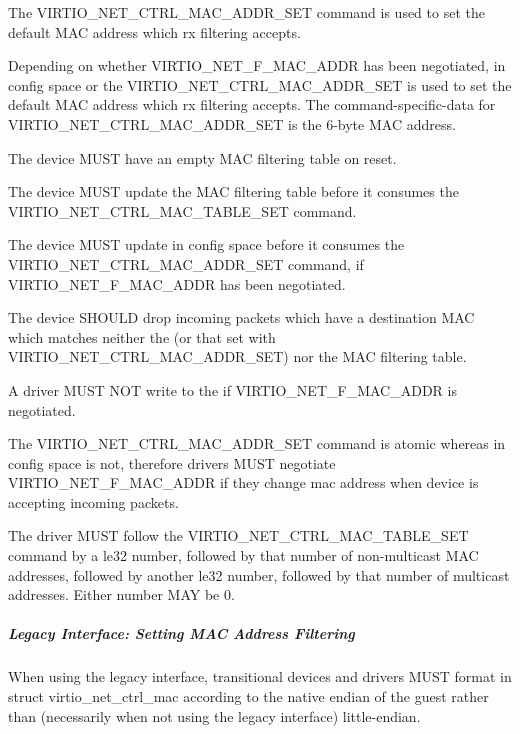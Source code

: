 The VIRTIO_NET_CTRL_MAC_ADDR_SET command is used to set the
default MAC address which rx filtering
accepts.

Depending on whether VIRTIO_NET_F_MAC_ADDR has been negotiated,
 in config space or the VIRTIO_NET_CTRL_MAC_ADDR_SET
is used to set the default MAC address which rx filtering
accepts.
The command-specific-data for VIRTIO_NET_CTRL_MAC_ADDR_SET is
the 6-byte MAC address.


The device MUST have an empty MAC filtering table on reset.

The device MUST update the MAC filtering table before it consumes
the VIRTIO_NET_CTRL_MAC_TABLE_SET command.

The device MUST update  in config space before it consumes
the VIRTIO_NET_CTRL_MAC_ADDR_SET command, if VIRTIO_NET_F_MAC_ADDR has
been negotiated.

The device SHOULD drop incoming packets which have a destination MAC which
matches neither the  (or that set with VIRTIO_NET_CTRL_MAC_ADDR_SET)
nor the MAC filtering table.


A driver MUST NOT write to the  if VIRTIO_NET_F_MAC_ADDR is
negotiated.

The
VIRTIO_NET_CTRL_MAC_ADDR_SET command is atomic whereas
 in config space is not, therefore drivers
MUST negotiate VIRTIO_NET_F_MAC_ADDR if they change
mac address when device is accepting incoming packets.

The driver MUST follow the VIRTIO_NET_CTRL_MAC_TABLE_SET command
by a le32 number, followed by that number of non-multicast
MAC addresses, followed by another le32 number, followed by
that number of multicast addresses.  Either number MAY be 0.

\subparagraph{Legacy Interface: Setting MAC Address Filtering}\label{sec:Device Types / Network Device / Device Operation / Control Virtqueue / Setting MAC Address Filtering / Legacy Interface: Setting MAC Address Filtering}
When using the legacy interface, transitional devices and drivers
MUST format  in struct virtio_net_ctrl_mac
according to the native endian of the guest rather than
(necessarily when not using the legacy interface) little-endian.

